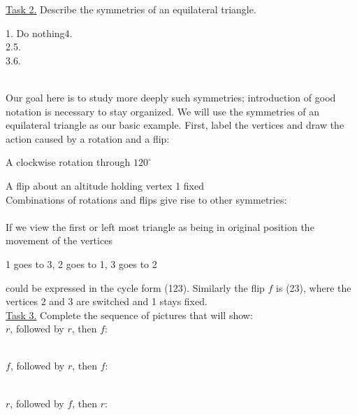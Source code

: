 \documentclass[12pt]{article}
\theoremstyle{definition}
\begin{document}
\underline{Task 2.}  Describe the symmetries of an equilateral triangle.\\[.1 in]
\begin{minipage}{2 in}

\end{minipage}
\begin{minipage}{3 in}
1. Do nothing\hfill 4.\\
2.\hfill 5.\\
3.\hfill 6.
\end{minipage}\\[.2 in]
\newpage
Our goal here is to study more deeply such symmetries; introduction of good notation is necessary to stay organized.  We will use the symmetries of an equilateral triangle as our basic example.  First, label the vertices and draw the action caused by a rotation and a flip:\\[.1in]
\begin{minipage}{3.75in}\def\svgwidth{2.75in}
  \end{minipage}  A clockwise rotation through $120^\circ$\\[.1in]
\begin{minipage}{3.75in}\def\svgwidth{2.75in}\end{minipage}  A flip about an altitude holding vertex 1 fixed\\[.1in]
Combinations of rotations and flips give rise to other symmetries:\\[.1in]
\def\svgwidth{6in}\\
If we view the first or left most triangle as being in original position the movement of the vertices
\centerline{1 goes to 3, 2 goes to 1, 3 goes to 2}
could be expressed in the cycle form (123).  Similarly the flip $f$ is (23), where the vertices 2 and 3 are switched and 1 stays fixed.\\[.1in]
\underline{Task 3.}  Complete the sequence of pictures that will show:\\
$r$, followed by $r$, then $f$: \begin{minipage}{3.75in}\def\svgwidth{1.75in}\end{minipage}\\[.1in]
$f$, followed by $r$, then $f$: \begin{minipage}{3.75in}\def\svgwidth{1.75in}\end{minipage}\\[.1in]
$r$, followed by $f$, then $r$: \begin{minipage}{3.75in}\def\svgwidth{1.75in}\end{minipage}\\[.1in]
\end{document}
